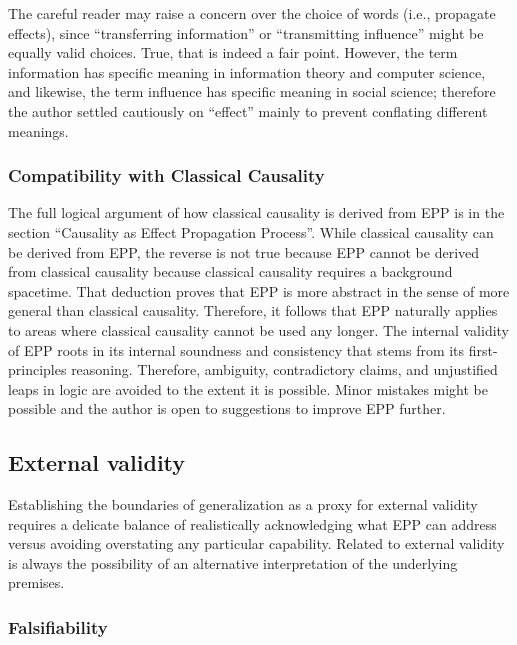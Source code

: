 The careful reader may raise a concern over the choice of words (i.e., propagate effects), since “transferring information” or “transmitting influence” might be equally valid choices. True, that is indeed a fair point. However, the term information has specific meaning in information theory and computer science, and likewise, the term influence has specific meaning in social science; therefore the author settled cautiously on “effect” mainly to prevent conflating different meanings.

\subsubsection{Compatibility with Classical Causality}

The full logical argument of how classical causality is derived from EPP is in the section “Causality as Effect Propagation Process”.
While classical causality can be derived from EPP, the reverse is not true because EPP cannot be derived from classical causality because classical causality requires a background spacetime. That deduction proves that EPP is more abstract in the sense of more general than classical causality. Therefore, it follows that EPP naturally applies to areas where classical causality cannot be used any longer. The internal validity of EPP roots in its internal soundness and consistency that stems from its first-principles reasoning. Therefore, ambiguity, contradictory claims, and unjustified leaps in logic are avoided to the extent it is possible. Minor mistakes might be possible and the author is open to suggestions  to improve EPP further.

\newpage

\subsection{External validity}
\label{sec:validity_external}

Establishing the boundaries of generalization as a proxy for external validity requires a delicate balance of realistically acknowledging what EPP can address versus avoiding overstating  any particular capability. Related to external validity is always the possibility of an alternative interpretation of the underlying premises.


\subsubsection{Falsifiability}

